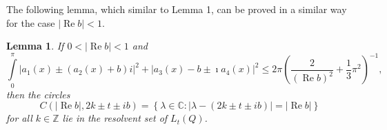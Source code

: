 \documentclass{article}%
\newtheorem{lemma}{Lemma}
{}
\begin{document}
The following lemma, which similar to Lemma 1, can be proved in a similar way
for the case $\left\vert \operatorname{Re}b\right\vert <1$.

\begin{lemma}
If $0<\left\vert \operatorname{Re}b\right\vert <1$ and
\begin{equation}
\int\limits_{0}^{\pi}\left\vert a_{1}(x)\pm\left(  a_{2}(x)+b\right)
i\right\vert ^{2}+\left\vert a_{3}(x)-b\pm\imath a_{4}(x)\right\vert ^{2}%
\leq2\pi\left(  \frac{2}{\left(  \operatorname{Re}b\right)  ^{2}}+\frac{1}%
{3}\pi^{2}\right)  ^{-1}, \tag{35}%
\end{equation}
then the circles
\[
C(\left\vert \operatorname{Re}b\right\vert ,2k\pm t\pm ib)=\left\{  \lambda
\in\mathbb{C}:\left\vert \lambda-(2k\pm t\pm ib)\right\vert =\left\vert
\operatorname{Re}b\right\vert \right\}
\]
for all $k\in\mathbb{Z}$ lie in the resolvent set of $L_{t}(Q)$.
\end{lemma}
\end{document}
